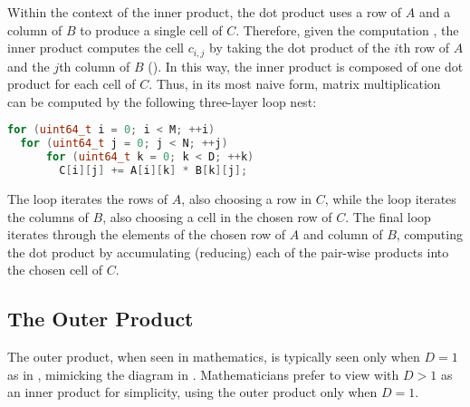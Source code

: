 \documentclass[\main/thesis.tex]{subfiles}
\begin{document}
Within the context of the inner product, the dot product uses a row of $A$ and a column of $B$ to produce a single cell of $C$.
Therefore, given the computation , the inner product computes the cell $c_{i,j}$ by taking the dot product of the $i$th row of $A$ and the $j$th column of $B$ ().
In this way, the inner product is composed of one dot product for each cell of $C$.
Thus, in its most naive form, matrix multiplication can be computed by the following three-layer loop nest:
\begin{lstlisting}[caption={[Basic inner product]A basic matrix multiplication via inner product.},label=lst:basicInner,language=C++,columns=flexible,morekeywords=uint64_t]
for (uint64_t i = 0; i < M; ++i)
  for (uint64_t j = 0; j < N; ++j)
      for (uint64_t k = 0; k < D; ++k)
        C[i][j] += A[i][k] * B[k][j];
\end{lstlisting}
The  loop iterates the rows of $A$, also choosing a row in $C$, while the  loop iterates the columns of $B$, also choosing a cell in the chosen row of $C$.
The final  loop iterates through the elements of the chosen row of $A$ and column of $B$, computing the dot product by accumulating (reducing) each of the pair-wise products into the chosen cell of $C$.

\subsection{The Outer Product}
\label{sec:outerProduct}
The outer product, when seen in mathematics, is typically seen only when $D=1$ as in , mimicking the diagram in .
Mathematicians prefer to view  with $D > 1$ as an inner product for simplicity, using the outer product only when $D=1$.
\end{document}
